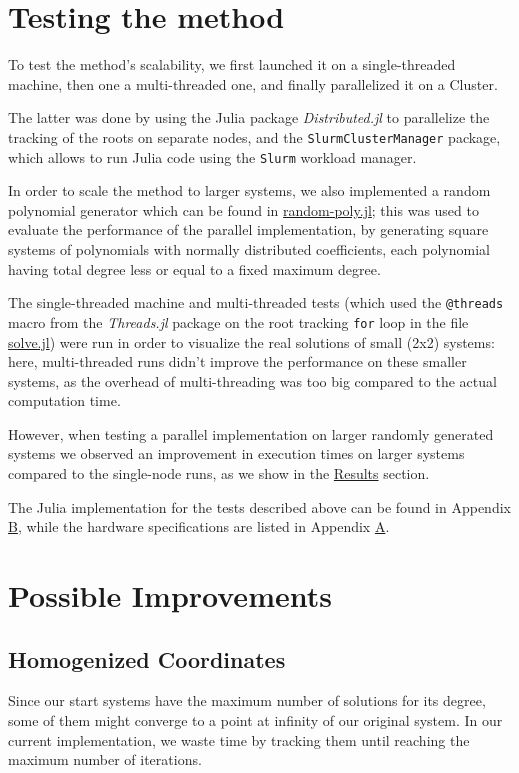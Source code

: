 \documentclass[a4paper]{article}
\theoremstyle{definition}
\theoremstyle{definition}
\theoremstyle{remark}
\theoremstyle{definition}
\begin{document}
\section{Testing the method}
To test the method's scalability, we first launched it on a single-threaded machine, then one a multi-threaded one, and finally parallelized it on a Cluster.

The latter was done by using the Julia package \textit{Distributed.jl} to parallelize the tracking of the roots on separate nodes, and the \texttt{SlurmClusterManager} package, which allows
to run Julia code using the \texttt{Slurm} workload manager.

In order to scale the method to larger systems, we also implemented a random polynomial generator which can be found in \hyperref[sec:random]{random-poly.jl}; this was used to
evaluate the performance of the parallel implementation, by generating square systems of polynomials with normally distributed coefficients, each
polynomial having total degree less or equal to a fixed maximum degree.

The single-threaded machine and multi-threaded tests (which used the \texttt{@threads}
macro from the \textit{Threads.jl} package on the root tracking \texttt{for} loop in the file \hyperref[sec:listing]{solve.jl}) were run in order to visualize the real solutions of
small (2x2) systems: here, multi-threaded runs didn't improve the
performance on these smaller systems, as the overhead of multi-threading was too big compared to the actual computation time.

However, when testing a parallel implementation on larger randomly generated systems we observed an improvement in execution times on larger systems compared to the single-node
runs, as we show in the \hyperref[sec:parallel]{Results} section.

The Julia implementation for the tests described above can be found in Appendix \hyperref[sec:listing]{B}, while
the hardware specifications are listed in Appendix \hyperref[sec:hw]{A}.

\section{Possible Improvements}

\subsection{Homogenized Coordinates}

Since our start systems have the maximum number of solutions for its degree, some of them might converge to a point at infinity of our original system. In our current
implementation, we waste time by tracking them until reaching the maximum number of iterations.
\end{document}
